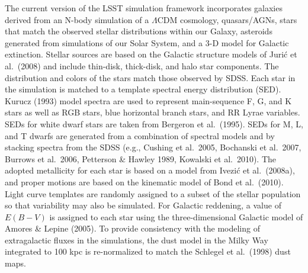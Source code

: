 \documentclass{emulateapj}
\begin{document}
{The current version of the LSST simulation framework incorporates
galaxies derived from an N-body simulation of a $\Lambda$CDM
cosmology, quasars/AGNs, stars that match the observed stellar
distributions within our Galaxy, asteroids generated from simulations
of our Solar System, and a 3-D model for Galactic extinction.  Stellar
sources are based on the Galactic structure models of Juri\'{c} et
al.~(2008) and include thin-disk, thick-disk, and halo star
components. The distribution and colors of the stars match those
observed by SDSS. Each star in the simulation is matched to a template
spectral energy distribution (SED). Kurucz (1993) model spectra are
used to represent main-sequence F, G, and K stars as well as RGB
stars, blue horizontal branch stars, and RR Lyrae variables.  SEDs for
white dwarf stars are taken from Bergeron et al.~(1995).  SEDs for M,
L, and T dwarfs are generated from a combination of spectral models
and by stacking spectra from the SDSS (e.g., Cushing et al.~2005,
Bochanski et al.~2007, Burrows et al.~2006, Petterson \& Hawley 1989,
Kowalski et al.~2010). The adopted metallicity for each star is based
on a model from Ivezi\'{c} et al.~(2008a), and proper motions are
based on the kinematic model of Bond et al.~(2010).  Light curve
templates are randomly assigned to a subset of the stellar population
so that variability may also be simulated. For Galactic reddening, a
value of $E(B-V)$ is assigned to each star using the three-dimensional
Galactic model of Amores \& Lepine (2005). To provide consistency with
the modeling of extragalactic fluxes in the simulations, the dust model in the Milky Way integrated
to 100 kpc is re-normalized to match the Schlegel et al.~(1998) dust maps.

}
\end{document}
